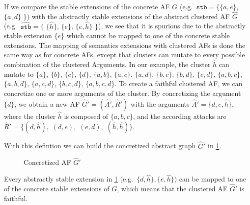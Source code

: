 If we compare the stable extensions of the concrete AF $G$ (e.g.\ 
$\mathtt{stb=}\bigl\{\{a, e\}$, $\{a, d\}$ $\bigl\}$) with the abstractly stable extensions of the abstract clustered AF $\hat{G}$ (e.g.\ 
$\mathtt{\hat{stb}}=\bigl\{$ 
$\{\hat{h}\}$, 
$\{e\}$, 
$\{e, \hat{h}\}$ 
$\bigl\}$), 
we see that it is spurious due to the abstractly stable extension $\{e\}$ which cannot be mapped to one of the concrete stable extensions. The mapping of semantics extensions with clustered AFs is done the same way as for concrete AFs, except that clusters can mutate to every possible combination of the clustered Arguments. In our example, the cluster $\hat{h}$ can mutate to 
$\{a\}$, 
$\{b\}$, 
$\{c\}$, 
$\{d\}$, 
$\{a, b\}$, 
$\{a, c\}$, 
$\{a, d\}$, 
$\{b, c\}$, 
$\{b, d\}$, 
$\{c, d\}$, 
$\{a, b, c\}$, 
$\{a, b, d\}$, 
$\{a, c, d\}$, 
$\{b, c, d\}$, 
$\{a, b, c, d\}$.
To create a faithful clustered AF, we can concretize one or more arguments of the cluster. By concretizing the argument $\{d\}$, we obtain a new AF $\hat{G}'=(\hat{A}', \hat{R}')$ with the arguments $\hat{A}'=\{d, e, \hat{h}\}$, where the cluster $\hat{h}$ is composed of $\{a, b, c\}$, and the according attacks are $\hat{R}'=\{(d, \hat{h}),$
$(d, e),$
$(e, d),$
$(\hat{h}, \hat{h})\}$.

With this defintion we can build the concretized abstract graph $\hat{G}'$ in \cref{af:backgroundClusterExample3}.


\begin{figure}[h]
    \centering
    \caption{Concretized AF $\hat{G}'$}
    \label{af:backgroundClusterExample3}
\end{figure}

Every abstractly stable extension in \cref{af:backgroundClusterExample3} (e.g.\ $\{d, \hat{h}\}, \{e, \hat{h}\})$ can be mapped to one of the concrete stable extensions of $G$, which means that the clustered AF $\hat{G}'$ is faithful.


